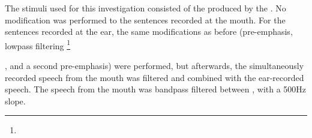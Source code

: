 \DIFaddend The stimuli used for this investigation consisted of the \DIFdelbegin {}\DIFdelend \DIFaddbegin {}\DIFaddend produced by the \DIFdelbegin {}\DIFdelend \DIFaddbegin {}\DIFaddend .
No modification was performed to the sentences recorded at the mouth.  For the sentences recorded at the ear, the same modifications as before (pre-emphasis, lowpass filtering \DIFdelbegin \footnote{}%
\addtocounter{footnote}{-1}%
\DIFdelend \DIFaddbegin {}\DIFaddend , and a second pre-emphasis) were performed, but afterwards, the simultaneously recorded speech from the mouth was filtered and combined with the ear-recorded speech.  The speech from the mouth was bandpass filtered between \DIFdelbegin {}\DIFdelend \DIFaddbegin {}\DIFaddend , with a 500Hz slope.  
\DIFdelbegin %
{%
}
\DIFdelend \DIFaddbegin 

